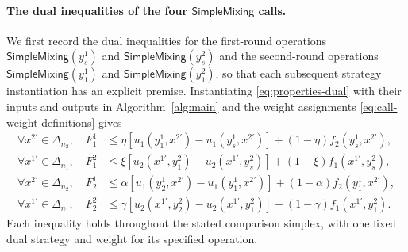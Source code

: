 \documentclass[11pt]{article}
\theoremstyle{remark}
\theoremstyle{plain}
\newcommand{\sm}{\mathsf{SimpleMixing}}
\begin{document}
\paragraph{The dual inequalities of the four $\sm$ calls.}
We first record the dual inequalities for the first-round operations
$\sm(y_s^1)$ and $\sm(y_s^2)$ and the second-round operations
$\sm(y_1^1)$ and $\sm(y_1^2)$, so that each subsequent strategy
instantiation has an explicit premise. Instantiating
\eqref{eq:properties-dual} with their inputs and outputs in
Algorithm~\ref{alg:main} and the weight assignments
\eqref{eq:call-weight-definitions} gives
\begin{subequations}
\label{eq:app-four-call-clauses}
\begin{align}
 \forall x^{2\prime}\in\Delta_{n_2},\quad
 F_1^1&\le
 \eta[u_1(y_1^1,x^{2\prime})-u_1(y_s^1,x^{2\prime})]
 +(1-\eta)f_2(y_s^1,x^{2\prime}),
 \label{eq:first-row-instance}\\
 \forall x^{1\prime}\in\Delta_{n_1},\quad
 F_1^2&\le
 \xi[u_2(x^{1\prime},y_1^2)-u_2(x^{1\prime},y_s^2)]
 +(1-\xi)f_1(x^{1\prime},y_s^2),
 \label{eq:app-first-column-instance}\\
 \forall x^{2\prime}\in\Delta_{n_2},\quad
 F_2^1&\le
 \alpha[u_1(y_2^1,x^{2\prime})-u_1(y_1^1,x^{2\prime})]
 +(1-\alpha)f_2(y_1^1,x^{2\prime}),
 \label{eq:app-second-row-instance}\\
 \forall x^{1\prime}\in\Delta_{n_1},\quad
 F_2^2&\le
 \gamma[u_2(x^{1\prime},y_2^2)-u_2(x^{1\prime},y_1^2)]
 +(1-\gamma)f_1(x^{1\prime},y_1^2).
 \label{eq:app-second-column-instance}
\end{align}
\end{subequations}
Each inequality holds throughout the stated comparison simplex,
with one fixed dual strategy and weight for its specified operation.
\end{document}
